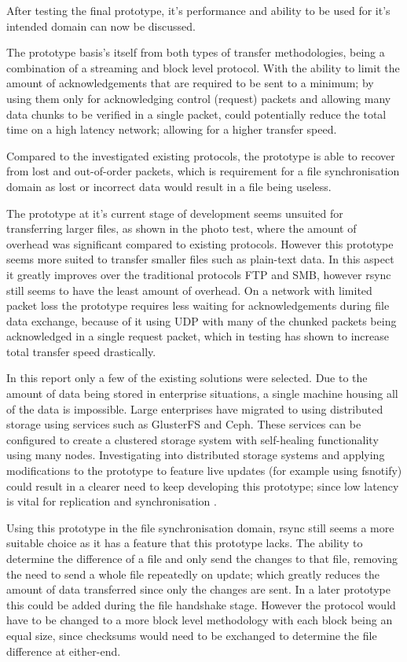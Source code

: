 After testing the final prototype, it's performance and ability to be used for it's intended domain can now be discussed.

The prototype basis's itself from both types of transfer methodologies, being a combination of a streaming and block level protocol. With the ability to limit the amount of acknowledgements that are required to be sent to a minimum; by using them only for acknowledging control (request) packets and allowing many data chunks to be verified in a single packet, could potentially reduce the total time on a high latency network; allowing for a higher transfer speed.

Compared to the investigated existing protocols, the prototype is able to recover from lost and out-of-order packets, which is requirement for a file synchronisation domain as lost or incorrect data would result in a file being useless.

The prototype at it's current stage of development seems unsuited for transferring larger files, as shown in the photo test, where the amount of overhead was significant compared to existing protocols. However this prototype seems more suited to transfer smaller files such as plain-text data. In this aspect it greatly improves over the traditional protocols FTP and SMB, however rsync still seems to have the least amount of overhead. On a network with limited packet loss the prototype requires less waiting for acknowledgements during file data exchange, because of it using UDP with many of the chunked packets being acknowledged in a single request packet, which in testing has shown to increase total transfer speed drastically.

In this report only a few of the existing solutions were selected. Due to the amount of data being stored in enterprise situations, a single machine housing all of the data is impossible. Large enterprises have migrated to using distributed storage using services such as GlusterFS and Ceph. These services can be configured to create a clustered storage system with self-healing functionality using many nodes. Investigating into distributed storage systems and applying modifications to the prototype to feature live updates (for example using fsnotify) could result in a clearer need to keep developing this prototype; since low latency is vital for replication and synchronisation \parencite{broomfieldone} \parencite{aye2015platform} \parencite{weil2006ceph}.

Using this prototype in the file synchronisation domain, rsync still seems a more suitable choice as it has a feature that this prototype lacks. The ability to determine the difference of a file and only send the changes to that file, removing the need to send a whole file repeatedly on update; which greatly reduces the amount of data transferred since only the changes are sent. In a later prototype this could be added during the file handshake stage. However the protocol would have to be changed to a more block level methodology with each block being an equal size, since checksums would need to be exchanged to determine the file difference at either-end.

